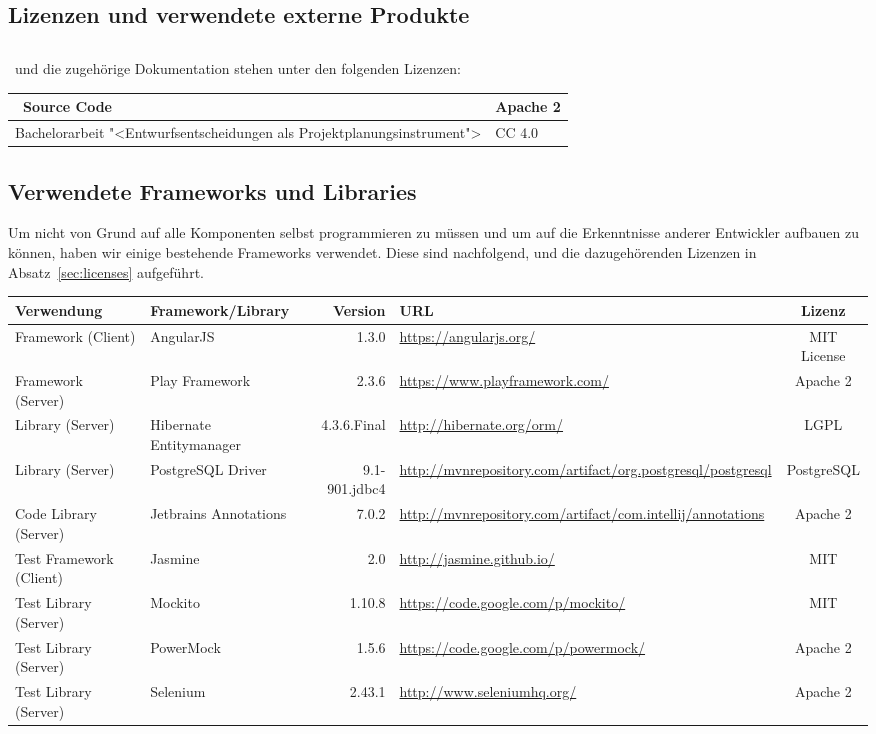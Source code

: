 \begin{landscape}
\chapter{Lizenzen und verwendete externe Produkte}
	\section{\eeppi}
	\label{sec:eeppiLisences}
		
	\eeppi\ und die zugehörige Dokumentation stehen unter den folgenden Lizenzen:
	\vspace{0.5cm}
	
	\begin{tabularx}{\linewidth}{|l|X|}
		\hline
		\eeppi\ Source Code & Apache 2\\
		\hline
		Bachelorarbeit "<Entwurfsentscheidungen als Projektplanungsinstrument"> & CC 4.0\\
		\hline
	\end{tabularx}
	

	\section{Verwendete Frameworks und Libraries}
	\label{sec:usedLibrariesAndFrameworks}
	Um nicht von Grund auf alle Komponenten selbst programmieren zu müssen 
	und um auf die Erkenntnisse anderer Entwickler aufbauen zu können,
	haben wir einige bestehende Frameworks verwendet.
	Diese sind nachfolgend, und die dazugehörenden Lizenzen in Absatz~\ref{sec:licenses} aufgeführt.
	
	
	\vspace{0.5cm}
	
	\newcommand{\addLib}[5]{
		#5 & #1 & #2 & \url{#3} & #4 \\
		\hline
	}
	
	
	\begin{tabularx}{\linewidth}{| l | l r | X | c |}
		\hline
		\textbf{Verwendung} & \textbf{Framework/Library} & \textbf{Version} & \textbf{URL} & \textbf{Lizenz} \\
		\hline \hline
		\addLib{AngularJS}{1.3.0}{https://angularjs.org/}{MIT License}{Framework (Client)}
		\addLib{Play Framework}{2.3.6}{https://www.playframework.com/}{Apache 2}{Framework (Server)}
		\addLib{Hibernate Entitymanager}{4.3.6.Final}{http://hibernate.org/orm/}{LGPL}{Library (Server)}
		\addLib{PostgreSQL Driver}{9.1-901.jdbc4}{http://mvnrepository.com/artifact/org.postgresql/postgresql}{PostgreSQL}{Library (Server)}
		\addLib{Jetbrains Annotations}{7.0.2}{http://mvnrepository.com/artifact/com.intellij/annotations}{Apache 2}{Code Library (Server)}
		\addLib{Jasmine}{2.0}{http://jasmine.github.io/}{MIT}{Test Framework (Client)}
		\addLib{Mockito}{1.10.8}{https://code.google.com/p/mockito/}{MIT}{Test Library (Server)}
		\addLib{PowerMock}{1.5.6}{https://code.google.com/p/powermock/}{Apache 2}{Test Library (Server)}
		\addLib{Selenium}{2.43.1}{http://www.seleniumhq.org/}{Apache 2}{Test Library (Server)}
	\end{tabularx}


\end{landscape}
